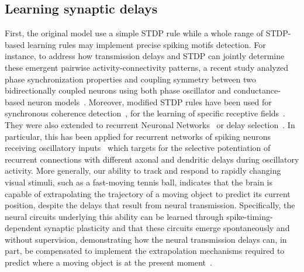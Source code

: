 \documentclass[brainsci, %
               review,submit,pdftex,moreauthors
               ]{Definitions/mdpi}
\begin{document}
% 
\subsection{Learning synaptic delays}
First, the original model use a simple STDP rule while a whole range of STDP-based learning rules may implement precise spiking motifs detection. For instance, to address how transmission delays and STDP can jointly determine these emergent pairwise activity-connectivity patterns, a recent study analyzed phase synchronization properties and coupling symmetry between two bidirectionally coupled neurons using both phase oscillator and conductance-based neuron models~\citep{madadi_asl_delay-dependent_2022}. Moreover, modified STDP rules have been used for synchronous coherence detection~\citep{perrinet_coherence_2002}, for the learning of specific receptive fields~\citep{perrinet_networks_2001}. They were also extended to recurrent Neuronal Networks~\citep{gilson_stdp_2010} or delay selection~\citep{datadien_right_2011}. In particular, this has been applied for recurrent networks of spiking neurons receiving oscillatory inputs~\citep{kerr_delay_2013} which targets for the selective potentiation of recurrent connections with different axonal and dendritic delays during oscillatory activity. More generally, our ability to track and respond to rapidly changing visual stimuli, such as a fast-moving tennis ball, indicates that the brain is capable of extrapolating the trajectory of a moving object to predict its current position, despite the delays that result from neural transmission. Specifically, the neural circuits underlying this ability can be learned through spike-timing-dependent synaptic plasticity and that these circuits emerge spontaneously and without supervision, demonstrating how the neural transmission delays can, in part, be compensated to implement the extrapolation mechanisms required to predict where a moving object is at the present moment~\citep{burkitt_predictive_2021}.
\end{document}
